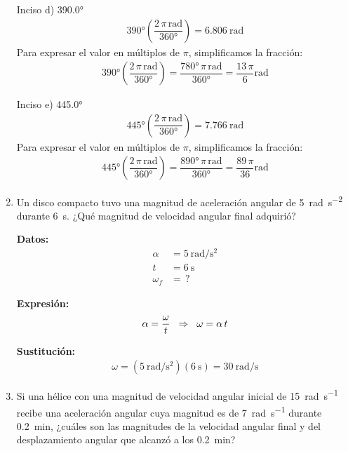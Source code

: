 \documentclass[14pt]{extarticle}
\begin{document}
\begin{enumerate}
Inciso d) \ang{390.0}
\begin{align*}
\ang{390} \left( \dfrac{2 \, \pi \, \unit{\radian}}{\ang{360}} \right) = \SI{6.806}{\radian}
\end{align*}
Para expresar el valor en múltiplos de $\pi$, simplificamos la fracción:
\begin{align*}
\ang{390} \left( \dfrac{2 \, \pi \, \unit{\radian}}{\ang{360}} \right) = \dfrac{\ang{780} \, \pi \, \unit{\radian}}{\ang{360}} = \dfrac{13 \, \pi}{6} \unit{\radian}
\end{align*}

Inciso e) \ang{445.0}
\begin{align*}
\ang{445} \left( \dfrac{2 \, \pi \, \unit{\radian}}{\ang{360}} \right) = \SI{7.766}{\radian}
\end{align*}
Para expresar el valor en múltiplos de $\pi$, simplificamos la fracción:
\begin{align*}
\ang{445} \left( \dfrac{2 \, \pi \, \unit{\radian}}{\ang{360}} \right) = \dfrac{\ang{890} \, \pi \, \unit{\radian}}{\ang{360}} = \dfrac{89 \,\pi}{36} \unit{\radian}
\end{align*}
\item Un disco compacto tuvo una magnitud de aceleración angular de \SI{5}{\radian\per\square\second} durante \SI{6}{\second}. ¿Qué magnitud de velocidad angular final adquirió?

\begin{minipage}[t]{0.4\linewidth}
\textbf{Datos:}
\begin{align*}
\alpha &= \SI{5}{\radian\per\square\second} \\
t &= \SI{6}{\second} \\
\omega_{f} &= \, ?
\end{align*}
\end{minipage}
\begin{minipage}[t]{0.4\linewidth}
\textbf{Expresión:}
\begin{align*}
\alpha = \dfrac{\omega}{t} \hspace{0.2cm} \Rightarrow \hspace{0.2cm} \omega = \alpha \,  t
\end{align*}
\end{minipage}

\textbf{Sustitución:}
\begin{align*}
\omega = \left( \SI[per-mode=fraction]{5}{\radian\per\square\second} \right) \left( \SI{6}{\second} \right) = \SI[per-mode=fraction]{30}{\radian\per\second}
\end{align*}
\item Si una hélice con una magnitud de velocidad angular inicial de \SI{15}{\radian\per\second} recibe una aceleración angular cuya magnitud es de \SI{7}{\radian\per\second} durante \SI{0.2}{\minute}, ¿cuáles son las magnitudes de la velocidad angular final y del desplazamiento angular que alcanzó a los \SI{0.2}{\minute}?


\end{enumerate}
\end{document}

